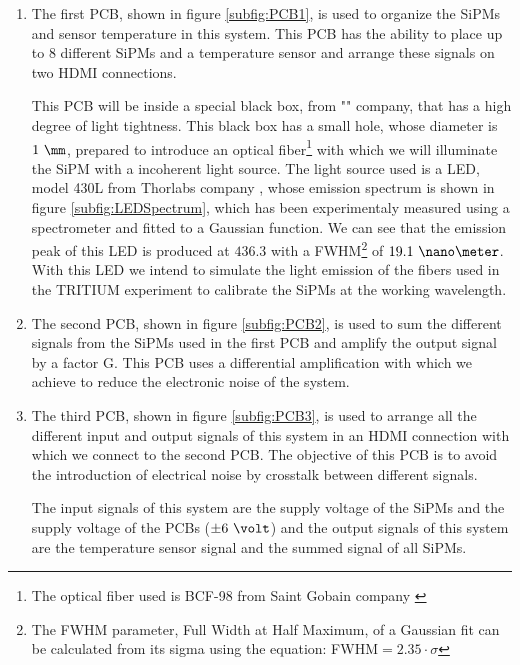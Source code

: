 \begin{enumerate}
\item{} The first PCB, shown in figure \ref{subfig:PCB1}, is used to organize the SiPMs and sensor temperature in this system. This PCB has the ability to place up to 8 different SiPMs and a temperature sensor and arrange these signals on two HDMI connections.

This PCB will be inside a special black box, from "" company, that has a high degree of light tightness. This black box has a small hole, whose diameter is $1~\mm$, prepared to introduce an optical fiber\footnote{The optical fiber used is BCF-98 from Saint Gobain company \cite{OpticalFibers}} with which we will illuminate the SiPM with a incoherent light source. The light source used is a LED, model 430L from Thorlabs company \cite{LEDThorlabs}, whose emission spectrum is shown in figure \ref{subfig:LEDSpectrum}, which has been experimentaly measured using a spectrometer and fitted to a Gaussian function. We can see that the emission peak of this LED is produced at $436.3$ with a FWHM\footnote{The FWHM parameter, Full Width at Half Maximum, of a Gaussian fit can be calculated from its sigma using the equation: FWHM$=2.35 \cdot{} \sigma$} of $19.1~\nano\meter$. With this LED we intend to simulate the light emission of the fibers used in the TRITIUM experiment to calibrate the SiPMs at the working wavelength. 

\item{} The second PCB, shown in figure \ref{subfig:PCB2}, is used to sum the different signals from the SiPMs used in the first PCB and amplify the output signal by a factor G. This PCB uses a differential amplification with which we achieve to reduce the electronic noise of the system.

\item{} The third PCB, shown in figure \ref{subfig:PCB3}, is used to arrange all the different input and output signals of this system in an HDMI connection with which we connect to the second PCB. The objective of this PCB is to avoid the introduction of electrical noise by crosstalk between different signals.

The input signals of this system are the supply voltage of the SiPMs and the supply voltage of the PCBs ($\pm 6~\volt$) and the output signals of this system are the temperature sensor signal and the summed signal of all SiPMs. 

\end{enumerate}

